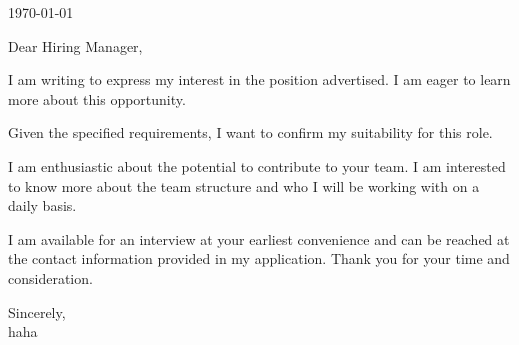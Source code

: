 \documentclass[letterpaper,11pt]{article}
\begin{document}
\today \\
\vspace{20pt}

Dear Hiring Manager, \\
\vspace{10pt}

I am writing to express my interest in the position advertised. I am eager to learn more about this opportunity.
\vspace{10pt}

Given the specified requirements, I want to confirm my suitability for this role.
\vspace{10pt}

I am enthusiastic about the potential to contribute to your team. I am interested to know more about the team structure and who I will be working with on a daily basis.
\vspace{10pt}

I am available for an interview at your earliest convenience and can be reached at the contact information provided in my application. Thank you for your time and consideration.
\vspace{20pt}

Sincerely, \\
\vspace{40pt} %
haha
\end{document}
